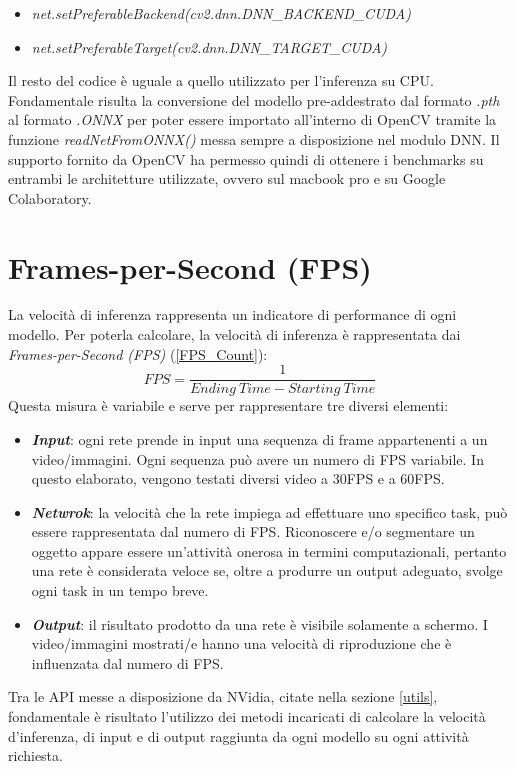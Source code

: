 \begin{itemize}
    \item \emph{net.setPreferableBackend(cv2.dnn.DNN\_BACKEND\_CUDA)}
    \item \emph{net.setPreferableTarget(cv2.dnn.DNN\_TARGET\_CUDA)}
\end{itemize}
Il resto del codice è uguale a quello utilizzato per l'inferenza su CPU.
Fondamentale risulta la conversione del modello pre-addestrato dal formato \emph{.pth} al formato \emph{.ONNX} per poter essere importato all'interno di OpenCV tramite la funzione \emph{readNetFromONNX()} messa sempre a disposizione nel modulo DNN.
Il supporto fornito da OpenCV ha permesso quindi di ottenere i benchmarks su entrambi le architetture utilizzate, ovvero sul macbook pro e su Google Colaboratory.

\section{Frames-per-Second (FPS)}
La velocità di inferenza rappresenta un indicatore di performance di ogni 
modello. Per poterla calcolare, la velocità di inferenza è rappresentata dai 
\emph{Frames-per-Second (FPS)} (\ref{FPS_Count}):
\begin{equation}\label{FPS_Count}
    FPS = \frac{1}{Ending \ Time - Starting \ Time}
\end{equation}
Questa misura è variabile e serve per rappresentare tre diversi elementi:
\begin{itemize}
    \item {\bfseries{\emph{Input}}}: ogni rete prende in input una sequenza di frame appartenenti 
    a un video/immagini. Ogni sequenza può avere un numero di FPS variabile. In 
    questo elaborato, vengono testati diversi video a 30FPS e a 60FPS.
    \item {\bfseries{\emph{Netwrok}}}: la velocità che la rete impiega ad effettuare uno specifico 
    task, può essere rappresentata dal numero di FPS. Riconoscere e/o 
    segmentare un oggetto appare essere un'attività onerosa in termini 
    computazionali, pertanto una rete è considerata veloce se, oltre a 
    produrre un output adeguato, svolge ogni task in un tempo breve.
    \item {\bfseries{\emph{Output}}}: il risultato prodotto da una rete è visibile solamente a 
    schermo. I video/immagini mostrati/e hanno una velocità di riproduzione 
    che è influenzata dal numero di FPS.
\end{itemize}
Tra le API messe a disposizione da NVidia, citate nella sezione \ref{utils}, 
fondamentale è risultato l'utilizzo dei metodi incaricati di calcolare la 
velocità d'inferenza, di input e di output raggiunta da ogni modello su ogni 
attività richiesta. 